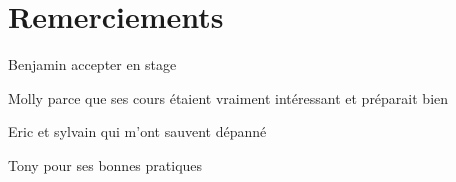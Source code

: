 \section*{Remerciements}

Benjamin accepter en stage


Molly parce que ses cours étaient vraiment intéressant et préparait bien

Eric et sylvain qui m'ont sauvent dépanné

Tony pour ses bonnes pratiques
